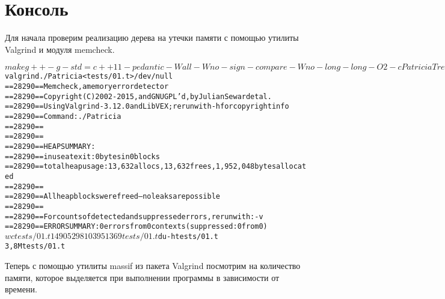 \documentclass[pdf, unicode, 12pt, a4paper,oneside,fleqn]{article}
\begin{document}
\section{Консоль}
Для начала проверим реализацию дерева на утечки памяти с помощью утилиты Valgrind и модуля memcheck.
\lstset{language=Bash}
\begin{alltt}
$ make
g++ -g -std=c++11 -pedantic -Wall -Wno-sign-compare -Wno-long-long 
	-O2 -c PatriciaTree.cpp
g++ -g -std=c++11 -pedantic -Wall -Wno-sign-compare -Wno-long-long 
	-O2 -c main.cpp
g++ -g -std=c++11 -pedantic -Wall -Wno-sign-compare -Wno-long-long 
	-O2 -o Patricia PatriciaTree.o main.o -lm
$ valgrind ./Patricia < tests/01.t > /dev/null
==28290== Memcheck, a memory error detector
==28290== Copyright (C) 2002-2015, and GNU GPL'd, by Julian Seward et al.
==28290== Using Valgrind-3.12.0 and LibVEX; rerun with -h for copyright info
==28290== Command: ./Patricia
==28290==
==28290==
==28290== HEAP SUMMARY:
==28290==     in use at exit: 0 bytes in 0 blocks
==28290==   total heap usage: 13,632 allocs, 13,632 frees, 1,952,048 bytes allocated
==28290==
==28290== All heap blocks were freed -- no leaks are possible
==28290==
==28290== For counts of detected and suppressed errors, rerun with: -v
==28290== ERROR SUMMARY: 0 errors from 0 contexts (suppressed: 0 from 0)
$ wc tests/01.t
  14905   29810 3951369 tests/01.t
$ du -h tests/01.t
3,8M	tests/01.t
\end{alltt}
\newpage
Теперь с помощью утилиты massif из пакета Valgrind посмотрим на количество памяти, которое выделяется при выполнении программы в зависимости от времени.
\end{document}
